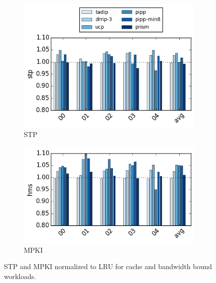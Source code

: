 \begin{figure}[t]
    \centering
    \begin{subfigure}[b]{0.5\textwidth}
        \includegraphics[width=\textwidth]{figures/results/speedup-stp-0128k-0100-cabw4}
        \caption{STP}
        \label{fig:results:base:cabw:stp}
    \end{subfigure}%
    \begin{subfigure}[b]{0.5\textwidth}
        \includegraphics[width=\textwidth]{figures/results/speedup-hms-0128k-0100-cabw4}
        \caption{MPKI}
        \label{fig:results:base:cabw:mpki}
    \end{subfigure}
    \caption[cabw workloads result]{STP and MPKI normalized to LRU for cache and bandwidth bound workloads.}
    \label{fig:results:base:cabw} 
\end{figure}


